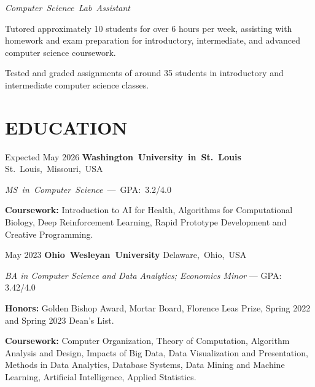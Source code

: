 \documentclass[10pt, letterpaper]{article}
\begin{document}
\vspace{\highlightSpacing}
\mbox{\textit{Computer Science Lab Assistant}}
\begin{onecolentry}
    \begin{highlights}
        \item Tutored approximately 10 students for over 6 hours per week, assisting with homework and exam preparation for introductory, intermediate, and advanced computer science coursework.
        \item Tested and graded assignments of around 35 students in introductory and intermediate computer science classes.
    \end{highlights}
\end{onecolentry}

\section{EDUCATION}

\begin{twocolentry}{Expected May 2026}
    \mbox{\textbf{Washington University in St. Louis}}
    \kern {}
    \AND
    \kern {}
    \mbox{St. Louis, Missouri, USA}
\end{twocolentry}

\vspace{\highlightSpacing}
\mbox{\textit{MS in Computer Science} --- GPA: 3.2/4.0}
\begin{onecolentry}
    \begin{highlights}
        \item \textbf{Coursework:} Introduction to AI for Health, Algorithms for Computational Biology, Deep Reinforcement Learning, Rapid Prototype Development and Creative Programming.
    \end{highlights}
\end{onecolentry}

\vspace{\entrySpacing}
\begin{twocolentry}{May 2023}
    \mbox{\textbf{Ohio Wesleyan University}}
    \kern {}
    \AND
    \kern {}
    \mbox{Delaware, Ohio, USA}
\end{twocolentry}

\vspace{\highlightSpacing}
{\textit{BA in Computer Science and Data Analytics; Economics Minor} --- GPA: 3.42/4.0}
\begin{onecolentry}
    \begin{highlights}
        \item \textbf{Honors:} Golden Bishop Award, Mortar Board, Florence Leas Prize, Spring 2022 and Spring 2023 Dean's List.

        \item \textbf{Coursework:} Computer Organization, Theory of Computation, Algorithm Analysis and Design, Impacts of Big Data, Data Visualization and Presentation, Methods in Data Analytics, Database Systems, Data Mining and Machine Learning, Artificial Intelligence, Applied Statistics.
    \end{highlights}
\end{onecolentry}
\end{document}
